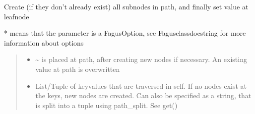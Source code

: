 \documentclass[a4paper,10pt,english]{sphinxmanual}
\begin{document}
\begin{fulllineitems}
\begin{fulllineitems}
\end{fulllineitems}


\begin{fulllineitems}
\label{\detokenize{fagus:fagus.Fagus.set}}
\pysigstartsignatures
{}
\pysigstopsignatures
\sphinxAtStartPar
Create (if they don’t already exist) all sub\sphinxhyphen{}nodes in path, and finally set value at leaf\sphinxhyphen{}node

\sphinxAtStartPar
* means that the parameter is a FagusOption, see Fagus\sphinxhyphen{}class\sphinxhyphen{}docstring for more information about options
\begin{quote}\begin{description}
\begin{itemize}
\item {}
\sphinxAtStartPar
{} \textendash{} \textasciitilde{} is placed at path, after creating new nodes if necessary. An existing value at path is overwritten

\item {}
\sphinxAtStartPar
{} \textendash{} List/Tuple of key\sphinxhyphen{}values that are traversed in self. If no nodes exist at the keys, new nodes are
created. Can also be specified as a string, that is split into a tuple using path\_split. See get()


\end{itemize}
\end{description}
\end{quote}
\end{fulllineitems}
\end{fulllineitems}
\end{document}
